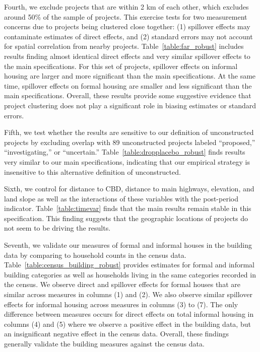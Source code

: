 \documentclass[12pt]{article}
\newcommand{\rv}{}
\begin{document}
\rv{Fourth, we exclude projects that are within 2 km of each other, which excludes around 50\% of the sample of projects.  This exercise tests for two measurement concerns due to projects being clustered close together: (1) spillover effects may contaminate estimates of direct effects, and (2) standard errors may not account for spatial correlation from nearby projects.  Table~\ref{table:far_robust} includes results finding almost identical direct effects and very similar spillover effects to the main specifications.  For this set of projects, spillover effects on informal housing are larger and more significant than the main specifications.  At the same time, spillover effects on formal housing are smaller and less significant than the main specifications.  Overall, these results provide some suggestive evidence that project clustering does not play a significant role in biasing estimates or standard errors.}

\rv{Fifth, we test whether the results are sensitive to our definition of unconstructed projects by excluding overlap with 89 unconstructed projects labeled ``proposed,'' ``investigating,'' or ``uncertain.''  Table~\ref{table:dropplacebo_robust} finds results very similar to our main specifications, indicating that our empirical strategy is insensitive to this alternative definition of unconstructed.}

\rv{Sixth, we control for distance to CBD, distance to main highways, elevation, and land slope as well as the interactions of these variables with the post-period indicator.  Table~\ref{table:timevar} finds that the main results remain stable in this specification.  This finding suggests that the geographic locations of projects do not seem to be driving the results.}


\rv{Seventh, we validate our measures of formal and informal houses in the building data by comparing to household counts in the census data.  Table~\ref{table:census_building_robust} provides estimates for formal and informal building categories as well as households living in the same categories recorded in the census.  We observe direct and spillover effects for formal houses that are similar across measures in columns (1) and (2).  We also observe similar spillover effects for informal housing across measures in columns (3) to (7).  The only difference between measures occurs for direct effects on total informal housing in columns (4) and (5) where we observe a positive effect in the building data, but an insignificant negative effect in the census data.  Overall, these findings generally validate the building measures against the census data.}
\end{document}
